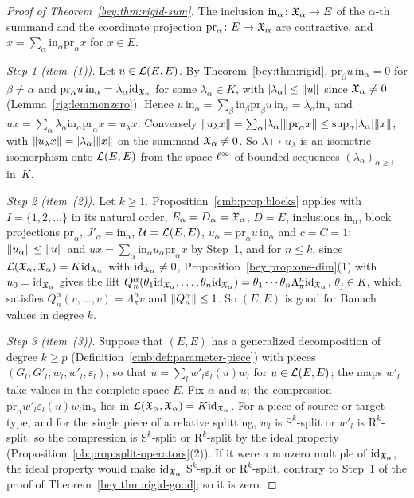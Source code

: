 \begin{proof}[Proof of Theorem~\textup{\ref{bey:thm:rigid-sum}}]
The inclusion $\mathrm{in}_\alpha\colon\mathfrak X_\alpha\to E$ of the $\alpha$\nobreakdash-th summand and the coordinate
projection $\mathrm{pr}_\alpha\colon E\to\mathfrak X_\alpha$ are contractive, and $x=\sum_\alpha\mathrm{in}_\alpha\mathrm{pr}_\alpha x$
for $x\in E$.

\emph{Step 1 (item~(1)).} Let $u\in\mathcal L(E,E)$. By Theorem~\ref{bey:thm:rigid}, $\mathrm{pr}_\beta u\,\mathrm{in}_\alpha=0$
for $\beta\ne\alpha$ and $\mathrm{pr}_\alpha u\,\mathrm{in}_\alpha=\lambda_\alpha\mathrm{id}_{\mathfrak X_\alpha}$ for some
$\lambda_\alpha\in K$, with $\lvert \lambda_\alpha\rvert\le\lVert u\rVert$ since $\mathfrak X_\alpha\ne0$ (Lemma~\ref{rig:lem:nonzero}). Hence
$u\,\mathrm{in}_\alpha=\sum_\beta\mathrm{in}_\beta\mathrm{pr}_\beta u\,\mathrm{in}_\alpha=\lambda_\alpha\mathrm{in}_\alpha$
and $ux=\sum_\alpha\lambda_\alpha\mathrm{in}_\alpha\mathrm{pr}_\alpha x=u_\lambda x$. Conversely $\lVert u_\lambda x\rVert=\sum_\alpha\lvert \lambda_\alpha\rvert\lVert \mathrm{pr}_\alpha x\rVert\le\sup_\alpha\lvert \lambda_\alpha\rvert\lVert x\rVert$,
with $\lVert u_\lambda x\rVert=\lvert \lambda_\alpha\rvert\lVert x\rVert$ on the summand $\mathfrak X_\alpha\ne0$. So $\lambda\mapsto u_\lambda$ is an
isometric isomorphism onto $\mathcal L(E,E)$ from the space $\ell^\infty$ of bounded sequences $(\lambda_\alpha)_{\alpha\ge1}$ in~$K$.

\emph{Step 2 (item~(2)).} Let $k\ge1$. Proposition~\ref{cmb:prop:blocks} applies with $I=\{1,2,\dots\}$ in its natural
order, $E_\alpha=D_\alpha=\mathfrak X_\alpha$, $D=E$, inclusions $\mathrm{in}_\alpha$, block projections $\mathrm{pr}_\alpha$,
$J'_\alpha=\mathrm{in}_\alpha$, $\mathcal U=\mathcal L(E,E)$, $u_\alpha=\mathrm{pr}_\alpha u\,\mathrm{in}_\alpha$ and $c=C=1$:
$\lVert u_\alpha\rVert\le\lVert u\rVert$ and $ux=\sum_\alpha\mathrm{in}_\alpha u_\alpha\mathrm{pr}_\alpha x$ by Step~1, and for
$n\le k$, since $\mathcal L(\mathfrak X_\alpha,\mathfrak X_\alpha)=K\mathrm{id}_{\mathfrak X_\alpha}$ with $\mathrm{id}_{\mathfrak X_\alpha}\ne0$,
Proposition~\ref{bey:prop:one-dim}(1) with $u_0=\mathrm{id}_{\mathfrak X_\alpha}$ gives the lift
$Q^\alpha_n(\theta_1\mathrm{id}_{\mathfrak X_\alpha},\dots,\theta_n\mathrm{id}_{\mathfrak X_\alpha})=\theta_1\cdots\theta_n\Lambda^n_\pi\mathrm{id}_{\mathfrak X_\alpha}$,
$\theta_j\in K$, which satisfies $Q^\alpha_n(v,\dots,v)=\Lambda^n_\pi v$ and $\lVert Q^\alpha_n\rVert\le1$. So $(E,E)$ is good
for Banach values in degree $k$.

\emph{Step 3 (item~(3)).} Suppose that $(E,E)$ has a generalized decomposition of degree $k\ge p$
(Definition~\ref{cmb:def:parameter-piece}) with pieces $(G_l,G'_l,w_l,w'_l,\varepsilon_l)$, so that
$u=\sum_lw'_l\varepsilon_l(u)w_l$ for $u\in\mathcal L(E,E)$; the maps $w'_l$ take values in the complete space $E$. Fix $\alpha$
and $u$; the compression $\mathrm{pr}_\alpha w'_l\varepsilon_l(u)w_l\mathrm{in}_\alpha$ lies in
$\mathcal L(\mathfrak X_\alpha,\mathfrak X_\alpha)=K\mathrm{id}_{\mathfrak X_\alpha}$. For a piece of source or target type, and for the single piece of a
relative splitting, $w_l$ is $\mathrm S^k$-split or $w'_l$ is $\mathrm R^k$-split, so the compression is
$\mathrm S^k$-split or $\mathrm R^k$-split by the ideal property (Proposition~\ref{ob:prop:split-operators}(2)). If it
were a nonzero multiple of $\mathrm{id}_{\mathfrak X_\alpha}$, the ideal property would make $\mathrm{id}_{\mathfrak X_\alpha}$ $\mathrm S^k$-split or
$\mathrm R^k$-split, contrary to Step~1 of the proof of Theorem~\ref{bey:thm:rigid-good}; so it is zero.


\end{proof}
